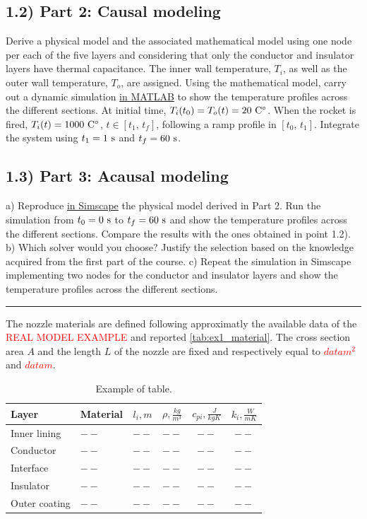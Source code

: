 \documentclass[11pt,a4paper,oneside]{article}
\newcommand{\tr}{\textcolor{red}}
\begin{document}
\subsection*{1.2) Part 2: Causal modeling}
Derive a physical model and the associated mathematical model using one node per each of the five layers and considering that only the conductor and insulator layers have thermal capacitance.
The inner wall temperature, $T_i$, as well as the outer wall temperature, $T_o$, are assigned.
Using the mathematical model, carry out a dynamic simulation \underline{in MATLAB} to show the temperature profiles across the different sections.
At initial time, $T_i(t_0)=T_o(t) = 20\ {\rm C^\circ}$. When the rocket is fired, $T_i(t) = 1000\ {\rm C^\circ}$, $t\in[t_1,\,t_f]$, following a ramp profile in $[t_0,\,t_1]$.
Integrate the system using $t_1 = 1\ {\rm s}$ and $t_f = 60\ {\rm s}$.

\subsection*{1.3) Part 3: Acausal modeling}
a) Reproduce \underline{in Simscape} the physical model derived in Part 2. Run the simulation from $t_0 = 0\ {\rm s}$ to $t_f = 60\ {\rm s}$ and show the temperature profiles across the different sections. Compare the results with the ones obtained in point 1.2). 
b) Which solver would you choose? Justify the selection based on the knowledge acquired from the first part of the course.
c) Repeat the simulation in Simscape implementing two nodes for the conductor and insulator layers and show the temperature profiles across the different sections.
\medskip

\medskip \hrule \medskip
{}

The nozzle materials are defined following approximatly the available data of the \tr{REAL MODEL EXAMPLE} and reported \cref{tab:ex1_material}.
The cross section area $A$ and the length $L$ of the nozzle are fixed and respectively equal to \tr{$data m^2$} and \tr{$data m$}.
\begin{table}[ht]
    \centering
    \caption{\label{tab:ex1_exampleoftable}Example of table.}
    \begin{tabular}{llcccc}
        \toprule
        \toprule
        Layer &  Material & $l_i, m$ & $\rho, \frac{kg}{m^3}$ & $c_{pi}, \frac{J}{kgK}$ & $k_i, \frac{W}{mK}$  \\ 
        \midrule
        Inner lining    & $--$ & $--$ & $--$ & $--$ & $--$ \\ 
        Conductor       & $--$ & $--$ & $--$ & $--$ & $--$ \\ 
        Interface       & $--$ & $--$ & $--$ & $--$ & $--$ \\ 
        Insulator       & $--$ & $--$ & $--$ & $--$ & $--$ \\ 
        Outer coating   & $--$ & $--$ & $--$ & $--$ & $--$ \\ 
        \bottomrule
        \bottomrule
    \end{tabular}
\end{table}
\end{document}
